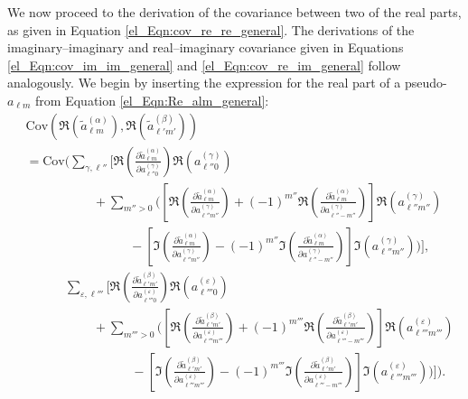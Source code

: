 We now proceed to the derivation of the covariance between two of the real parts, as given in Equation
\eqref{el_Eqn:cov_re_re_general}. The derivations of the imaginary--imaginary and real--imaginary covariance given in Equations \eqref{el_Eqn:cov_im_im_general}
and \eqref{el_Eqn:cov_re_im_general} follow analogously. We begin by inserting the expression for the real part of a pseudo-$a_{\ell m}$ from Equation \eqref{el_Eqn:Re_alm_general}:
\begin{equation}
\begin{split}
& \mathrm{Cov} \left(
\Re \left( \widetilde{a}_{\ell m}^{ \left( \alpha \right) } \right),
\Re \left( \widetilde{a}_{\ell' m'}^{ \left( \beta \right) } \right)
\right) \\
&=
\mathrm{Cov} \Bigg(
\sum_{\gamma, \ell''} \Bigg[
\Re \left(
\frac{\partial \widetilde{a}_{\ell m}^{ \left( \alpha \right) }}
{\partial a_{\ell'' 0}^{ \left( \gamma \right) }}
\right)
\Re \left( a_{\ell'' 0}^{ \left( \gamma \right) } \right) \\
&~~~~~~~~~~~~~~~~~~~~~~~~ +
\sum_{m'' > 0} \Bigg( \left[
\Re \left(
\frac{\partial \widetilde{a}_{\ell m}^{ \left( \alpha \right) }}
{\partial a_{\ell'' m''}^{ \left( \gamma \right) }}
\right)
+ \left( -1 \right)^{m''}
\Re \left(
\frac{\partial \widetilde{a}_{\ell m}^{ \left( \alpha \right) }}
{\partial a_{\ell'' -m''}^{ \left( \gamma \right) }}
\right) \right]
\Re \left(
a_{\ell'' m''}^{ \left( \gamma \right) }
\right) \\
&~~~~~~~~~~~~~~~~~~~~~~~~~~~~~~~~~~~~~ -
\left[ \Im \left(
\frac{\partial \widetilde{a}_{\ell m}^{ \left( \alpha \right) }}
{\partial a_{\ell'' m''}^{ \left( \gamma \right) }}
\right)
- \left( -1 \right)^{m''}
\Im \left(
\frac{\partial \widetilde{a}_{\ell m}^{ \left( \alpha \right) }}
{\partial a_{\ell'' -m''}^{ \left( \gamma \right) }}
\right) \right]
\Im \left(
a_{\ell'' m''}^{ \left( \gamma \right) }
\right) \Bigg) \Bigg], \\
&~~~~~~~~~~~~~~
\sum_{\varepsilon, \ell'''} \Bigg[
\Re \left(
\frac{\partial \widetilde{a}_{\ell' m'}^{ \left( \beta \right) }}
{\partial a_{\ell''' 0}^{ \left( \varepsilon \right) }}
\right)
\Re \left( a_{\ell''' 0}^{ \left( \varepsilon \right) } \right) \\
&~~~~~~~~~~~~~~~~~~~~~~~~ +
\sum_{m''' > 0} \Bigg( \left[
\Re \left(
\frac{\partial \widetilde{a}_{\ell' m'}^{ \left( \beta \right) }}
{\partial a_{\ell''' m'''}^{ \left( \varepsilon \right) }}
\right)
+ \left( -1 \right)^{m'''}
\Re \left(
\frac{\partial \widetilde{a}_{\ell' m'}^{ \left( \beta \right) }}
{\partial a_{\ell''' -m'''}^{ \left( \varepsilon \right) }}
\right) \right]
\Re \left(
a_{\ell''' m'''}^{ \left( \varepsilon \right) }
\right) \\
&~~~~~~~~~~~~~~~~~~~~~~~~~~~~~~~~~~~~~\, -
\left[ \Im \left(
\frac{\partial \widetilde{a}_{\ell' m'}^{ \left( \beta \right) }}
{\partial a_{\ell''' m'''}^{ \left( \varepsilon \right) }}
\right)
- \left( -1 \right)^{m'''}
\Im \left(
\frac{\partial \widetilde{a}_{\ell' m'}^{ \left( \beta \right) }}
{\partial a_{\ell''' -m'''}^{ \left( \varepsilon \right) }}
\right) \right]
\Im \left(
a_{\ell''' m'''}^{ \left( \varepsilon \right) }
\right) \Bigg) \Bigg] \Bigg).
\end{split}
\end{equation}
